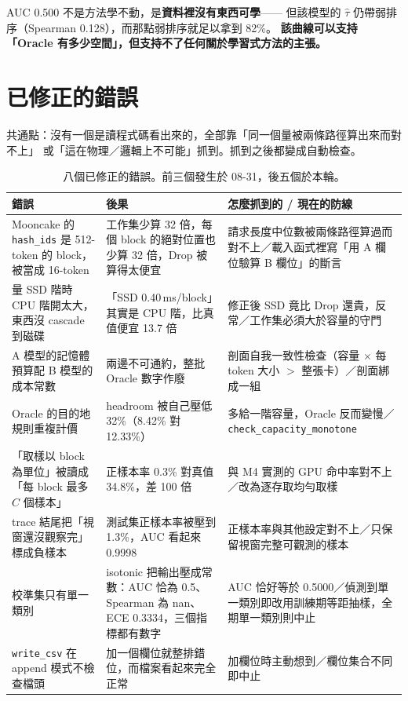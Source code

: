 \documentclass[11pt]{article}
\newcommand{\act}[1]{\textsf{\footnotesize #1}}
\newcommand{\key}[1]{\textcolor{hlcol}{\textbf{#1}}}
\begin{document}
\noindent AUC 0.500 不是方法學不動，是\key{資料裡沒有東西可學}——
但該模型的 $\hat\tau$ 仍帶弱排序（Spearman 0.128），而那點弱排序就足以拿到 82\%。
\textbf{該曲線可以支持「Oracle 有多少空間」，但支持不了任何關於學習式方法的主張。}

\section{已修正的錯誤}

共通點：沒有一個是讀程式碼看出來的，全部靠「同一個量被兩條路徑算出來而對不上」
或「這在物理／邏輯上不可能」抓到。抓到之後都變成自動檢查。

\begin{table}[htbp]\centering\small
\caption{八個已修正的錯誤。前三個發生於 08-31，後五個於本輪。}
\begin{tabular}{p{3.6cm}p{4.4cm}p{5.2cm}}
\toprule
錯誤 & 後果 & 怎麼抓到的 / 現在的防線 \\
\midrule
Mooncake 的 \texttt{hash\_ids} 是 512-token 的 block，被當成 16-token &
工作集少算 32 倍，每個 block 的絕對位置也少算 32 倍，\act{Drop} 被算得太便宜 &
請求長度中位數被兩條路徑算過而對不上／載入函式裡寫「用 A 欄位驗算 B 欄位」的斷言 \\
量 SSD 階時 CPU 階開太大，東西沒 cascade 到磁碟 &
「SSD 0.40\,ms/block」其實是 CPU 階，比真值便宜 13.7 倍 &
修正後 SSD 竟比 \act{Drop} 還貴，反常／工作集必須大於容量的守門 \\
A 模型的記憶體預算配 B 模型的成本常數 &
兩邊不可通約，整批 Oracle 數字作廢 &
剖面自我一致性檢查（容量 $\times$ 每 token 大小 $>$ 整張卡）／剖面綁成一組 \\
Oracle 的目的地規則重複計價 &
headroom 被自己壓低 32\%（8.42\% 對 12.33\%） &
多給一階容量，Oracle 反而變慢／\texttt{check\_capacity\_monotone} \\
「取樣以 block 為單位」被讀成「每 block 最多 $C$ 個樣本」 &
正樣本率 0.3\% 對真值 34.8\%，差 100 倍 &
與 M4 實測的 GPU 命中率對不上／改為逐存取均勻取樣 \\
trace 結尾把「視窗還沒觀察完」標成負樣本 &
測試集正樣本率被壓到 1.3\%，AUC 看起來 0.9998 &
正樣本率與其他設定對不上／只保留視窗完整可觀測的樣本 \\
校準集只有單一類別 &
isotonic 把輸出壓成常數：AUC 恰為 0.5、Spearman 為 nan、ECE 0.3334，三個指標都有數字 &
AUC 恰好等於 0.5000／偵測到單一類別即改用訓練期等距抽樣，全期單一類別則中止 \\
\texttt{write\_csv} 在 append 模式不檢查檔頭 &
加一個欄位就整排錯位，而檔案看起來完全正常 &
加欄位時主動想到／欄位集合不同即中止 \\
\bottomrule
\end{tabular}
\end{table}
\end{document}

